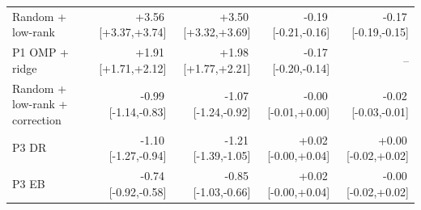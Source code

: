 {\begin{tabular}{lrrrr}
Random + low-rank & +3.56\,{\tiny[+3.37,+3.74]} & +3.50\,{\tiny[+3.32,+3.69]} & -0.19\,{\tiny[-0.21,-0.16]} & -0.17\,{\tiny[-0.19,-0.15]} \\
P1 OMP + ridge & +1.91\,{\tiny[+1.71,+2.12]} & +1.98\,{\tiny[+1.77,+2.21]} & -0.17\,{\tiny[-0.20,-0.14]} & -- \\
Random + low-rank + correction & -0.99\,{\tiny[-1.14,-0.83]} & -1.07\,{\tiny[-1.24,-0.92]} & -0.00\,{\tiny[-0.01,+0.00]} & -0.02\,{\tiny[-0.03,-0.01]} \\
P3 DR & -1.10\,{\tiny[-1.27,-0.94]} & -1.21\,{\tiny[-1.39,-1.05]} & +0.02\,{\tiny[-0.00,+0.04]} & +0.00\,{\tiny[-0.02,+0.02]} \\
P3 EB & -0.74\,{\tiny[-0.92,-0.58]} & -0.85\,{\tiny[-1.03,-0.66]} & +0.02\,{\tiny[-0.00,+0.04]} & -0.00\,{\tiny[-0.02,+0.02]} \\
\bottomrule
\end{tabular}}
